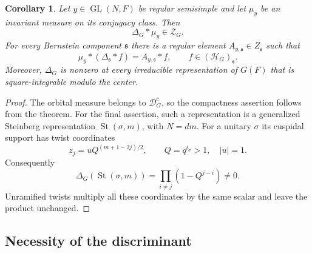 \documentclass[11pt,a4paper]{amsart}
\newcommand{\mcH}{\mathcal H}
\newcommand{\mcD}{\mathcal D}
\newcommand{\mcZ}{\mathcal Z}
\newtheorem{corollary}[theorem]{Corollary}
\theoremstyle{definition}
\theoremstyle{remark}
\DeclareMathOperator{\GL}{GL}
\newcommand{\grs}{\mathfrak s}
\newcommand{\St}{\operatorname{St}}
\begin{document}
\begin{corollary}\label{cor:orbital}
Let $y\in\GL(N,F)$ be regular semisimple and let $\mu_y$ be an
invariant measure on its conjugacy class. Then
$$
 \Delta_G*\mu_y\in\mcZ_G.
$$
For every Bernstein component $\grs$ there is a regular element
$A_{y,\grs}\in Z_{\grs}$ such that
$$
 \mu_y*(\Delta_{\grs}*f)=A_{y,\grs}*f,
 \qquad f\in(\mcH_G)_{\grs}.
$$
Moreover, $\Delta_G$ is nonzero at every irreducible representation
of $G(F)$ that is square-integrable modulo the center.
\end{corollary}
\begin{proof}
The orbital measure belongs to $\mcD_G^c$, so the compactness assertion
follows from the theorem. For the final assertion, such a representation
is a generalized Steinberg representation $\St(\sigma,m)$, with
$N=dm$. For a unitary $\sigma$ its cuspidal support has twist
coordinates
$$
 z_j=uQ^{(m+1-2j)/2},\qquad Q=q^{t_\sigma}>1,\quad |u|=1.
$$
Consequently
$$
 \Delta_G(\St(\sigma,m))=\prod_{i\ne j}(1-Q^{j-i})\ne0.
$$
Unramified twists multiply all these coordinates by the same scalar
and leave the product unchanged.
\end{proof}

\subsection{Necessity of the discriminant}
\end{document}
